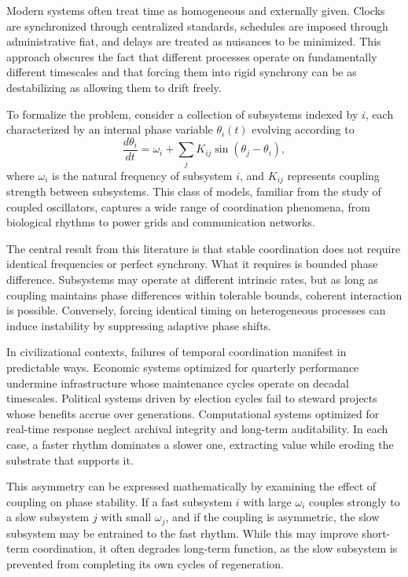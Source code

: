 \documentclass[12pt,oneside]{book}
\begin{document}
Modern systems often treat time as homogeneous and externally given. Clocks are synchronized through centralized standards, schedules are imposed through administrative fiat, and delays are treated as nuisances to be minimized. This approach obscures the fact that different processes operate on fundamentally different timescales and that forcing them into rigid synchrony can be as destabilizing as allowing them to drift freely.

To formalize the problem, consider a collection of subsystems indexed by \(i\), each characterized by an internal phase variable \(\theta_i(t)\) evolving according to
\[
\frac{d\theta_i}{dt} = \omega_i + \sum_{j} K_{ij} \sin(\theta_j - \theta_i),
\]
where \(\omega_i\) is the natural frequency of subsystem \(i\), and \(K_{ij}\) represents coupling strength between subsystems. This class of models, familiar from the study of coupled oscillators, captures a wide range of coordination phenomena, from biological rhythms to power grids and communication networks.

The central result from this literature is that stable coordination does not require identical frequencies or perfect synchrony. What it requires is bounded phase difference. Subsystems may operate at different intrinsic rates, but as long as coupling maintains phase differences within tolerable bounds, coherent interaction is possible. Conversely, forcing identical timing on heterogeneous processes can induce instability by suppressing adaptive phase shifts.

In civilizational contexts, failures of temporal coordination manifest in predictable ways. Economic systems optimized for quarterly performance undermine infrastructure whose maintenance cycles operate on decadal timescales. Political systems driven by election cycles fail to steward projects whose benefits accrue over generations. Computational systems optimized for real-time response neglect archival integrity and long-term auditability. In each case, a faster rhythm dominates a slower one, extracting value while eroding the substrate that supports it.

This asymmetry can be expressed mathematically by examining the effect of coupling on phase stability. If a fast subsystem \(i\) with large \(\omega_i\) couples strongly to a slow subsystem \(j\) with small \(\omega_j\), and if the coupling is asymmetric, the slow subsystem may be entrained to the fast rhythm. While this may improve short-term coordination, it often degrades long-term function, as the slow subsystem is prevented from completing its own cycles of regeneration.
\end{document}
